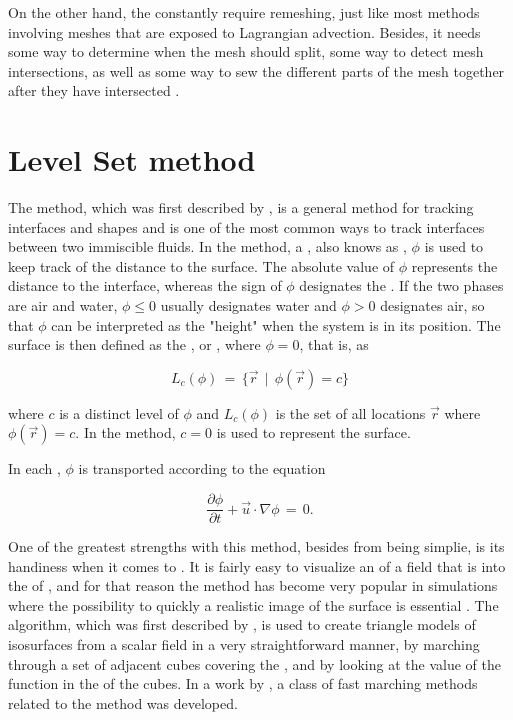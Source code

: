 On the other hand, the constantly require remeshing, just like most methods involving meshes that are exposed to Lagrangian advection. Besides, it needs some way to determine when the mesh should split, some way to detect mesh intersections, as well as some way to sew the different parts of the mesh together after they have intersected \citep{Wojtan2009}.

\section{Level Set method}

The \LS method, which was first described by \citet{Osher1988}, is a general method for tracking interfaces and shapes and is one of the most common ways to track interfaces between two immiscible fluids. In the \LS method, a , also knows as , $\phi$ is used to keep track of the distance to the surface. The absolute value of $\phi$ represents the distance to the interface, whereas the sign of $\phi$ designates the \phase. If the two phases are air and water, $\phi \leq 0$ usually designates water and $\phi > 0$ designates air, so that $\phi$ can be interpreted as the "height" when the system is in its \equilibrium position. The surface is then defined as the \isosurface, or , where $\phi = 0$, that is, as

\begin{equation} \label{eq:level_set}
L_c(\phi) \,=\, \{\vec{r} \,\mid\, \phi(\vec{r})=c\}
\end{equation}

where $c$ is a distinct level of $\phi$ and $L_c(\phi)$ is the set of all locations $\vec{r}$ where $\phi(\vec{r}) = c$. In the \LS method, $c = 0$ is used to represent the surface.

In each , $\phi$ is transported according to the equation

\begin{equation} \label{eq:level_set_function_transport}
\frac{\partial\phi}{\partial t} + \vec{u}\cdot\nabla\phi \,=\, 0.
\end{equation}

One of the greatest strengths with this method, besides from being simplie, is its handiness when it comes to . It is fairly easy to visualize an \isosurface of a field that is \discretized into the \nodes of , and for that reason the \LS method has become very popular in \FVM simulations where the possibility to quickly \render a realistic image of the surface is essential \citep{Losasso2004,Chentanez2011}. The  algorithm, which was first described by \citet{Lorensen1987}, is used to create triangle models of isosurfaces from a scalar field in a very straightforward manner, by marching through a set of adjacent cubes covering the , and by looking at the value of the function in the  of the cubes. In a work by \citet{Sethian1995}, a class of fast marching methods related to the \LS method was developed.

